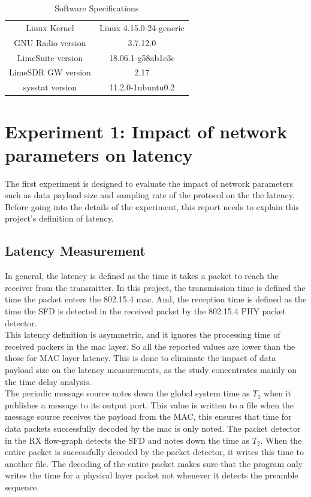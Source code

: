 \begin{table}[h!]
    \centering
    \begin{tabular}{|c|c|}
    \hline
         Linux Kernel &   Linux 4.15.0-24-generic \\
         GNU Radio version & 3.7.12.0 \\
         LimeSuite version &  18.06.1-g58ab1c3c \\
         LimeSDR GW version &   2.17\\
         sysstat version &  11.2.0-1ubuntu0.2\\
         \hline
    \end{tabular}
    \caption{Software Specifications}
    \label{software}
\end{table}

\section{Experiment 1: Impact of network parameters on latency}

The first experiment is designed to evaluate the impact of network parameters such as data payload size and sampling rate of the protocol on the the latency.
Before going into the details of the experiment, this report needs to explain this project's definition of latency.

\subsection{Latency Measurement}
In general, the latency is defined as the time it takes a packet to reach the receiver from the transmitter.
In this project, the transmission time is defined the time the packet enters the 802.15.4 \ac{mac}.
And, the reception time is defined as the time the SFD is detected in the received packet by the 802.15.4 PHY packet detector.\\

This latency definition is asymmetric, and it ignores the processing time of received packers in the \ac{mac} layer. So all the reported values are lower than the those for MAC layer latency.
This is done to eliminate the impact of data payload size on the latency measurements, as the study concentrates mainly on the time delay analysis.\\

The periodic message source notes down the global system time as $T_1$ when it publishes a message to its output port.
This value is written to a file when the message source receives the payload from the MAC, this ensures that time for data packets successfully decoded by the \ac{mac} is only noted.
The packet detector in the RX flow-graph detects the SFD and notes down the time as $T_2$.
When the entire packet is successfully decoded by the packet detector, it writes this time to another file.
The decoding of the entire packet makes sure that the program only writes the time for a physical layer packet not whenever it detects the preamble sequence.\\

